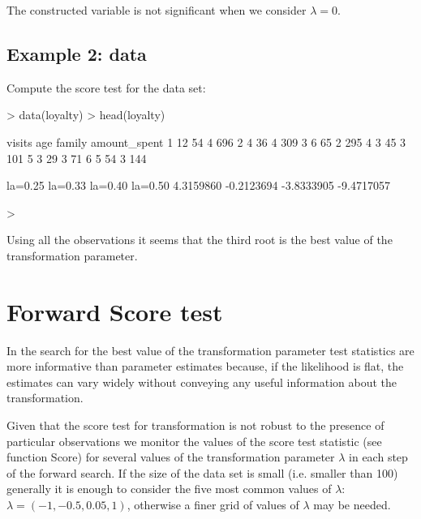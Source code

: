 \documentclass[article,shortnames,nojss]{jss}
\begin{document}
The constructed variable is not significant when we consider $\lambda=0$.

\subsection[Example 2: loyalty cards data]{Example 2:  data}

Compute the score test for the  data set:


\begin{Schunk}
\begin{Sinput}
> data(loyalty)
> head(loyalty)
\end{Sinput}
\begin{Soutput}
  visits age family amount_spent
1     12  54      4          696
2      4  36      4          309
3      6  65      2          295
4      3  45      3          101
5      3  29      3           71
6      5  54      3          144
\end{Soutput}
\begin{Soutput}
   la=0.25    la=0.33    la=0.40    la=0.50
 4.3159860 -0.2123694 -3.8333905 -9.4717057
\end{Soutput}
\begin{Sinput}
>
\end{Sinput}
\end{Schunk}

Using all the observations it seems that the third root is the best value of the transformation parameter.



\section{Forward Score test}

In the search for the best value of the transformation parameter test statistics are more informative than parameter estimates because, if the likelihood is flat, the estimates can vary widely without conveying any useful information about the transformation.

Given that the score test for transformation is not robust to the presence of particular observations we monitor the values of the score test statistic (see function Score) for several values of the transformation parameter $\lambda$ in each step of the forward search.
If the size of the data set is small (i.e. smaller than 100) generally it is enough to consider the five most common values of $\lambda$: $\lambda=(-1, -0.5, 0. 05, 1)$, otherwise a finer grid of values of $\lambda$ may be needed.
\end{document}
